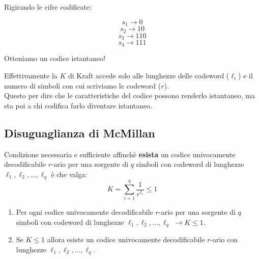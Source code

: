 Rigirando le cifre codificate:

\begin{equation*}
s_1 \rightarrow 0
\end{equation*}
\begin{equation*}
s_2 \rightarrow 10
\end{equation*}
\begin{equation*}
s_3 \rightarrow 110
\end{equation*}
\begin{equation*}
s_4 \rightarrow 111
\end{equation*}

Otteniamo un codice istantaneo!

Effettivamente la $K$ di Kraft accede solo alle lunghezze delle codeword ($\ell_i$) e il numero di simboli con cui scriviamo le codeword ($r$).\\
Questo per dire che le caratteristiche del codice possono renderlo istantaneo, ma sta poi a chi codifica farlo diventare istantaneo.

\subsection*{Disuguaglianza di McMillan}

\begin{theorem}
Condizione necessaria e sufficiente affinchè \textbf{esista} un codice univocamente decodificabile $r$-ario per una sorgente di $q$ simboli con codeword di lunghezze $\ell_1, \ell_2, ... , \ell_q$ è che valga:
\begin{equation}
K=\sum_{i=1}^q\frac{1}{r^{\ell_i}}\leq 1
\end{equation}
\end{theorem}

\begin{enumerate}
	\item Per ogni codice univocamente decodificabile $r$-ario per una sorgente di $q$ simboli con codeword di lunghezze $\ell_1, \ell_2,...,\ell_q$ $\rightarrow K \leq 1$.
	\item Se $K \leq 1$ allora esiste un codice univocamente decodificabile $r$-ario con lunghezze $\ell_1,\ell_2,...,\ell_q$.
\end{enumerate}

